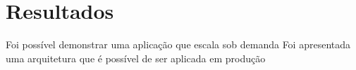 \part{Resultados}

Foi possível demonstrar uma aplicação que escala sob demanda
Foi apresentada uma arquitetura que é possível de ser aplicada em produção
